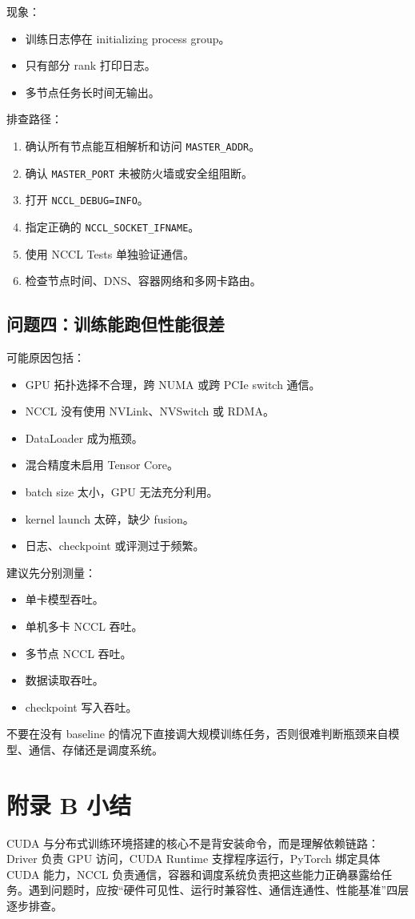 现象：

\begin{itemize}
\item 训练日志停在 initializing process group。
\item 只有部分 rank 打印日志。
\item 多节点任务长时间无输出。
\end{itemize}

排查路径：

\begin{enumerate}
\item 确认所有节点能互相解析和访问 \texttt{MASTER_ADDR}。
\item 确认 \texttt{MASTER_PORT} 未被防火墙或安全组阻断。
\item 打开 \texttt{NCCL_DEBUG=INFO}。
\item 指定正确的 \texttt{NCCL_SOCKET_IFNAME}。
\item 使用 NCCL Tests 单独验证通信。
\item 检查节点时间、DNS、容器网络和多网卡路由。
\end{enumerate}

\subsection{问题四：训练能跑但性能很差}

可能原因包括：

\begin{itemize}
\item GPU 拓扑选择不合理，跨 NUMA 或跨 PCIe switch 通信。
\item NCCL 没有使用 NVLink、NVSwitch 或 RDMA。
\item DataLoader 成为瓶颈。
\item 混合精度未启用 Tensor Core。
\item batch size 太小，GPU 无法充分利用。
\item kernel launch 太碎，缺少 fusion。
\item 日志、checkpoint 或评测过于频繁。
\end{itemize}

建议先分别测量：

\begin{itemize}
\item 单卡模型吞吐。
\item 单机多卡 NCCL 吞吐。
\item 多节点 NCCL 吞吐。
\item 数据读取吞吐。
\item checkpoint 写入吞吐。
\end{itemize}

不要在没有 baseline 的情况下直接调大规模训练任务，否则很难判断瓶颈来自模型、通信、存储还是调度系统。

\section{附录 B 小结}

CUDA 与分布式训练环境搭建的核心不是背安装命令，而是理解依赖链路：Driver 负责 GPU 访问，CUDA Runtime 支撑程序运行，PyTorch 绑定具体 CUDA 能力，NCCL 负责通信，容器和调度系统负责把这些能力正确暴露给任务。遇到问题时，应按“硬件可见性、运行时兼容性、通信连通性、性能基准”四层逐步排查。
